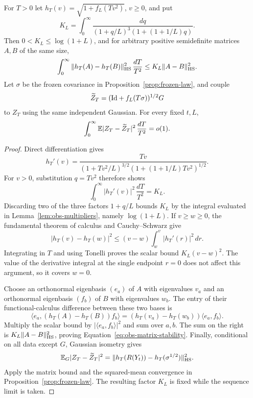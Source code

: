 \begin{samepage}
\begin{lemma}
\label{lem:obs-integrated-stability}
For $T>0$ let $h_T(v)=\sqrt{1+f_L(Tv^2)}$, $v\ge0$, and put
\[
 K_L=\int_0^\infty
 \frac{dq}{(1+q/L)^3(1+(1+1/L)q)}.
\]
Then $0<K_L\le\log(1+L)$, and for arbitrary positive semidefinite
matrices $A,B$ of the same size,
\begin{equation}\label{eq:obs-matrix-stability}
 \int_0^\infty\|h_T(A)-h_T(B)\|_{\mathrm{HS}}^2\,\frac{dT}{T^2}
 \le K_L\|A-B\|_{\mathrm{HS}}^2.
\end{equation}
Let $\sigma$ be the frozen covariance in
Proposition~\ref{prop:frozen-law}, and couple
\[
 \widetilde Z_T=(\mathrm{Id}+f_L(T\sigma))^{1/2}G
\]
to $Z_T$ using the same independent Gaussian.  For every fixed $t,L$,
\begin{equation}\label{eq:obs-observation-stability}
 \int_0^\infty\mathbb E|Z_T-\widetilde Z_T|^2\,\frac{dT}{T^2}=o(1).
\end{equation}
\end{lemma}
\end{samepage}

\begin{proof}
Direct differentiation gives
\[
 h_T'(v)=\frac{Tv}
 {(1+Tv^2/L)^{3/2}(1+(1+1/L)Tv^2)^{1/2}}.
\]
For $v>0$, substitution $q=Tv^2$ therefore shows
\[
 \int_0^\infty|h_T'(v)|^2\,\frac{dT}{T^2}=K_L.
\]
Discarding two of the three factors $1+q/L$ bounds $K_L$ by the
integral evaluated in Lemma~\ref{lem:obs-multipliers}, namely
$\log(1+L)$.  If $v\ge w\ge0$, the fundamental theorem of calculus
and Cauchy--Schwarz give
\[
 |h_T(v)-h_T(w)|^2
 \le(v-w)\int_w^v|h_T'(r)|^2\,dr.
\]
Integrating in $T$ and using Tonelli proves the scalar bound
$K_L(v-w)^2$.  The value of the derivative integral at the single
endpoint $r=0$ does not affect this argument, so it covers $w=0$.

Choose an orthonormal eigenbasis $(e_a)$ of $A$ with eigenvalues $v_a$
and an orthonormal eigenbasis $(f_b)$ of $B$ with eigenvalues $w_b$.
The entry of their functional-calculus difference between these two
bases is
\[
 \langle e_a,(h_T(A)-h_T(B))f_b\rangle
   =(h_T(v_a)-h_T(w_b))\langle e_a,f_b\rangle.
\]
Multiply the scalar bound by $|\langle e_a,f_b\rangle|^2$ and sum
over $a,b$.  The sum on the right is
$K_L\|A-B\|_{\mathrm{HS}}^2$, proving
Equation~\eqref{eq:obs-matrix-stability}.  Finally, conditional on all
data except $G$, Gaussian isometry gives
\[
 \mathbb E_G|Z_T-\widetilde Z_T|^2
 =\|h_T(R(Y_t))-h_T(\sigma^{1/2})\|_{\mathrm{HS}}^2.
\]
Apply the matrix bound and the squared-mean convergence in
Proposition~\ref{prop:frozen-law}.  The resulting factor $K_L$ is
fixed while the sequence limit is taken.
\end{proof}

